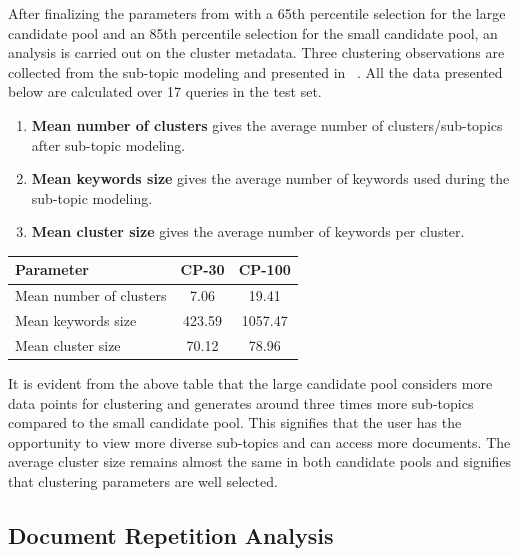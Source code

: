 After finalizing the parameters from  with a 65th percentile selection for the large candidate pool and an 85th percentile selection for the small candidate pool, an analysis is carried out on the cluster metadata. Three clustering observations are collected from the sub-topic modeling and presented in ~. All the data presented below are calculated over 17 queries in the test set.

\begin{enumerate}
	\item \textbf{Mean number of clusters} gives the average number of clusters/sub-topics after sub-topic modeling.
	\item \textbf{Mean keywords size} gives the average number of keywords used during the sub-topic modeling.
	\item \textbf{Mean cluster size} gives the average number of keywords per cluster.
\end{enumerate}

\begin{center}
	\label{tab:keyword_analysis}
	\begin{tabularx}{.6\textwidth}{|Y|c|c|}
		\hline
		Parameter & CP-30 & CP-100 \\
		\hline
		Mean number of clusters & 7.06 & 19.41 \\
		\hline
		Mean keywords size & 423.59 & 1057.47 \\
		\hline
		Mean cluster size & 70.12 & 78.96 \\
		\hline
	\end{tabularx}
\end{center}

It is evident from the above table that the large candidate pool considers more data points for clustering and generates around three times more sub-topics compared to the small candidate pool. This signifies that the user has the opportunity to view more diverse sub-topics and can access more documents. The average cluster size remains almost the same in both candidate pools and signifies that clustering parameters are well selected.

 \subsection{Document Repetition Analysis}
 
